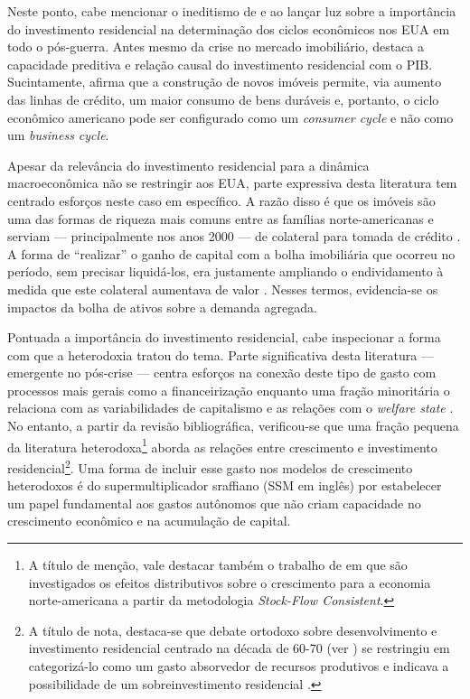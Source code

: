Neste ponto, cabe mencionar o ineditismo de \textcite{green_follow_1997} e \textcite{leamer_housing_2007} ao lançar luz sobre a importância do investimento residencial na determinação dos ciclos econômicos nos EUA em todo o pós-guerra.
Antes mesmo da crise no mercado imobiliário,
\textcite{leamer_housing_2007} destaca a capacidade preditiva e relação causal  do investimento residencial com o PIB. Sucintamente, afirma que a construção de novos imóveis permite, via aumento das linhas de crédito, um maior consumo de bens duráveis e, portanto, o ciclo econômico americano pode ser configurado como um \textit{consumer cycle} e não como um \textit{business cycle}.

Apesar da relevância do investimento residencial para a dinâmica macroeconômica não se restringir aos EUA, parte expressiva desta literatura tem centrado esforços neste caso em específico. A razão disso é que os imóveis são  uma das formas de riqueza mais comuns entre as famílias norte-americanas e serviam --- principalmente nos anos 2000 --- de colateral para tomada de crédito \cite{teixeira_uma_2011}. A forma de ``realizar'' o ganho de capital com a bolha imobiliária que ocorreu no período, sem precisar liquidá-los, era justamente ampliando o endividamento à medida que este colateral aumentava de valor \cite{teixeira_crescimento_2015}. Nesses termos, evidencia-se os impactos da bolha de ativos sobre a demanda agregada. 

Pontuada a importância do investimento residencial, cabe inspecionar a forma com que a heterodoxia tratou do tema. Parte significativa desta literatura  --- emergente no pós-crise --- centra esforços na conexão deste tipo de gasto com processos mais gerais como a financeirização \cites{aalbers_financialization_2008}{bibow_financialization_2010} enquanto uma fração minoritária o relaciona com as variabilidades de capitalismo e as relações com o \textit{welfare state} \cite{schwartz_politics_2009}. 
No entanto, a partir da revisão bibliográfica, verificou-se que uma fração pequena da literatura heterodoxa\footnote{
	A título de menção, vale destacar também o trabalho de \textcite{zezza_u.s._2008} em que são investigados os efeitos distributivos sobre o crescimento para a economia norte-americana a partir da metodologia \textit{Stock-Flow Consistent}.}
aborda as relações entre crescimento e investimento residencial\footnote{A título de nota, destaca-se que debate ortodoxo sobre desenvolvimento e investimento residencial centrado na década de 60-70 (ver \textcite{arku_housing_2006}) se restringiu em categorizá-lo como um gasto absorvedor de recursos produtivos e indicava  a possibilidade de um sobreinvestimento residencial \cites{solow_importance_1995}{mills_has_1987}. }. 
Uma forma de incluir esse gasto nos modelos de crescimento heterodoxos é do supermultiplicador sraffiano (SSM em inglês) por estabelecer um papel fundamental aos gastos autônomos que não criam capacidade no crescimento econômico e na acumulação de capital.

